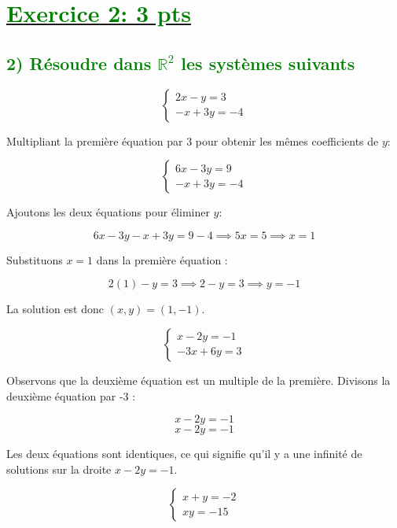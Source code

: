 \documentclass[12pt]{article}
\begin{document}
\section*{\underline{\textcolor{green}{Exercice 2: \textbf{3 pts}}}}

\subsection*{\textcolor{green}{2) Résoudre dans $\mathbb{R}^{2}$ les systèmes suivants }}

\[
\begin{cases}
2x - y = 3 \\
-x + 3y = -4
\end{cases}
\]

Multipliant la première équation par 3 pour obtenir les mêmes coefficients de \( y \):

\[
\begin{cases}
6x - 3y = 9 \\
-x + 3y = -4
\end{cases}
\]

Ajoutons les deux équations pour éliminer \( y \):

\[
6x - 3y - x + 3y = 9 - 4 \implies 5x = 5 \implies x = 1
\]

Substituons \( x = 1 \) dans la première équation :

\[
2(1) - y = 3 \implies 2 - y = 3 \implies y = -1
\]

La solution est donc \( (x, y) = (1, -1) \).

\[
\begin{cases}
x - 2y = -1 \\
-3x + 6y = 3
\end{cases}
\]

Observons que la deuxième équation est un multiple de la première. Divisons la deuxième équation par -3 :

\[
x - 2y = -1
\]
\[
x - 2y = -1
\]

Les deux équations sont identiques, ce qui signifie qu'il y a une infinité de solutions sur la droite \( x - 2y = -1 \). %



\[
\begin{cases}
x + y = -2 \\
xy = -15
\end{cases}
\]
\end{document}
